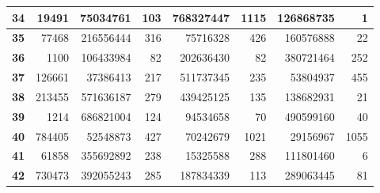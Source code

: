 \documentclass[12pt]{article}
\begin{document}
\begin{table}[!htbp]
{\begin{tabular}{crrrrrrr}
\multicolumn{1}{|c|}{\textbf{34}} & \multicolumn{1}{r|}{19491} & \multicolumn{1}{r|}{75034761} & \multicolumn{1}{r|}{103} & \multicolumn{1}{r|}{768327447} & \multicolumn{1}{r|}{1115} & \multicolumn{1}{r|}{126868735} & \multicolumn{1}{r|}{1} \\ \hline
\multicolumn{1}{|c|}{\textbf{35}} & \multicolumn{1}{r|}{77468} & \multicolumn{1}{r|}{216556444} & \multicolumn{1}{r|}{316} & \multicolumn{1}{r|}{75716328} & \multicolumn{1}{r|}{426} & \multicolumn{1}{r|}{160576888} & \multicolumn{1}{r|}{22} \\ \hline
\multicolumn{1}{|c|}{\textbf{36}} & \multicolumn{1}{r|}{1100} & \multicolumn{1}{r|}{106433984} & \multicolumn{1}{r|}{82} & \multicolumn{1}{r|}{202636430} & \multicolumn{1}{r|}{82} & \multicolumn{1}{r|}{380721464} & \multicolumn{1}{r|}{252} \\ \hline
\multicolumn{1}{|c|}{\textbf{37}} & \multicolumn{1}{r|}{126661} & \multicolumn{1}{r|}{37386413} & \multicolumn{1}{r|}{217} & \multicolumn{1}{r|}{511737345} & \multicolumn{1}{r|}{235} & \multicolumn{1}{r|}{53804937} & \multicolumn{1}{r|}{455} \\ \hline
\multicolumn{1}{|c|}{\textbf{38}} & \multicolumn{1}{r|}{213455} & \multicolumn{1}{r|}{571636187} & \multicolumn{1}{r|}{279} & \multicolumn{1}{r|}{439425125} & \multicolumn{1}{r|}{135} & \multicolumn{1}{r|}{138682931} & \multicolumn{1}{r|}{21} \\ \hline
\multicolumn{1}{|c|}{\textbf{39}} & \multicolumn{1}{r|}{1214} & \multicolumn{1}{r|}{686821004} & \multicolumn{1}{r|}{124} & \multicolumn{1}{r|}{94534658} & \multicolumn{1}{r|}{70} & \multicolumn{1}{r|}{490599160} & \multicolumn{1}{r|}{40} \\ \hline
\multicolumn{1}{|c|}{\textbf{40}} & \multicolumn{1}{r|}{784405} & \multicolumn{1}{r|}{52548873} & \multicolumn{1}{r|}{427} & \multicolumn{1}{r|}{70242679} & \multicolumn{1}{r|}{1021} & \multicolumn{1}{r|}{29156967} & \multicolumn{1}{r|}{1055} \\ \hline
\multicolumn{1}{|c|}{\textbf{41}} & \multicolumn{1}{r|}{61858} & \multicolumn{1}{r|}{355692892} & \multicolumn{1}{r|}{238} & \multicolumn{1}{r|}{15325588} & \multicolumn{1}{r|}{288} & \multicolumn{1}{r|}{111801460} & \multicolumn{1}{r|}{6} \\ \hline
\multicolumn{1}{|c|}{\textbf{42}} & \multicolumn{1}{r|}{730473} & \multicolumn{1}{r|}{392055243} & \multicolumn{1}{r|}{285} & \multicolumn{1}{r|}{187834339} & \multicolumn{1}{r|}{113} & \multicolumn{1}{r|}{289063445} & \multicolumn{1}{r|}{81} \\ \hline

\end{tabular}}
\end{table}
\end{document}

